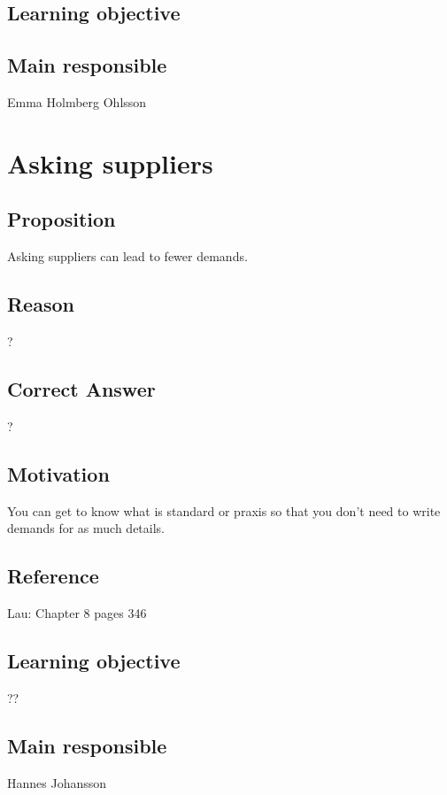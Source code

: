 \documentclass[a4paper]{article}
\begin{document}
\subsection*{Learning objective}

\subsection*{Main responsible}
Emma Holmberg Ohlsson


\section{Asking suppliers}
\subsection*{Proposition}
Asking suppliers can lead to fewer demands.
\subsection*{Reason}
?
\subsection*{Correct Answer}
?
\subsection*{Motivation}
You can get to know what is standard or praxis so that you don't need to write demands for as much details.
\subsection*{Reference}
Lau: Chapter 8 pages 346
\subsection*{Learning objective}
??
\subsection*{Main responsible}
Hannes Johansson
\end{document}

